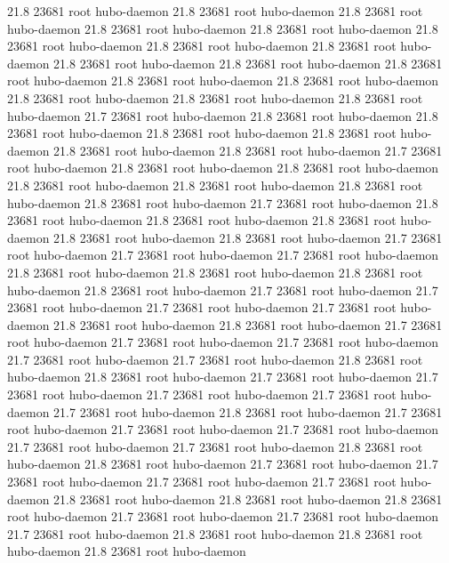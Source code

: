 21.8 23681 root     hubo-daemon
21.8 23681 root     hubo-daemon
21.8 23681 root     hubo-daemon
21.8 23681 root     hubo-daemon
21.8 23681 root     hubo-daemon
21.8 23681 root     hubo-daemon
21.8 23681 root     hubo-daemon
21.8 23681 root     hubo-daemon
21.8 23681 root     hubo-daemon
21.8 23681 root     hubo-daemon
21.8 23681 root     hubo-daemon
21.8 23681 root     hubo-daemon
21.8 23681 root     hubo-daemon
21.8 23681 root     hubo-daemon
21.8 23681 root     hubo-daemon
21.8 23681 root     hubo-daemon
21.7 23681 root     hubo-daemon
21.8 23681 root     hubo-daemon
21.8 23681 root     hubo-daemon
21.8 23681 root     hubo-daemon
21.8 23681 root     hubo-daemon
21.8 23681 root     hubo-daemon
21.8 23681 root     hubo-daemon
21.7 23681 root     hubo-daemon
21.8 23681 root     hubo-daemon
21.8 23681 root     hubo-daemon
21.8 23681 root     hubo-daemon
21.8 23681 root     hubo-daemon
21.8 23681 root     hubo-daemon
21.8 23681 root     hubo-daemon
21.7 23681 root     hubo-daemon
21.8 23681 root     hubo-daemon
21.8 23681 root     hubo-daemon
21.8 23681 root     hubo-daemon
21.8 23681 root     hubo-daemon
21.8 23681 root     hubo-daemon
21.7 23681 root     hubo-daemon
21.7 23681 root     hubo-daemon
21.7 23681 root     hubo-daemon
21.8 23681 root     hubo-daemon
21.8 23681 root     hubo-daemon
21.8 23681 root     hubo-daemon
21.8 23681 root     hubo-daemon
21.7 23681 root     hubo-daemon
21.7 23681 root     hubo-daemon
21.7 23681 root     hubo-daemon
21.7 23681 root     hubo-daemon
21.8 23681 root     hubo-daemon
21.8 23681 root     hubo-daemon
21.7 23681 root     hubo-daemon
21.7 23681 root     hubo-daemon
21.7 23681 root     hubo-daemon
21.7 23681 root     hubo-daemon
21.7 23681 root     hubo-daemon
21.8 23681 root     hubo-daemon
21.8 23681 root     hubo-daemon
21.7 23681 root     hubo-daemon
21.7 23681 root     hubo-daemon
21.7 23681 root     hubo-daemon
21.7 23681 root     hubo-daemon
21.7 23681 root     hubo-daemon
21.8 23681 root     hubo-daemon
21.7 23681 root     hubo-daemon
21.7 23681 root     hubo-daemon
21.7 23681 root     hubo-daemon
21.7 23681 root     hubo-daemon
21.7 23681 root     hubo-daemon
21.8 23681 root     hubo-daemon
21.8 23681 root     hubo-daemon
21.7 23681 root     hubo-daemon
21.7 23681 root     hubo-daemon
21.7 23681 root     hubo-daemon
21.7 23681 root     hubo-daemon
21.8 23681 root     hubo-daemon
21.8 23681 root     hubo-daemon
21.8 23681 root     hubo-daemon
21.7 23681 root     hubo-daemon
21.7 23681 root     hubo-daemon
21.7 23681 root     hubo-daemon
21.8 23681 root     hubo-daemon
21.8 23681 root     hubo-daemon
21.8 23681 root     hubo-daemon
